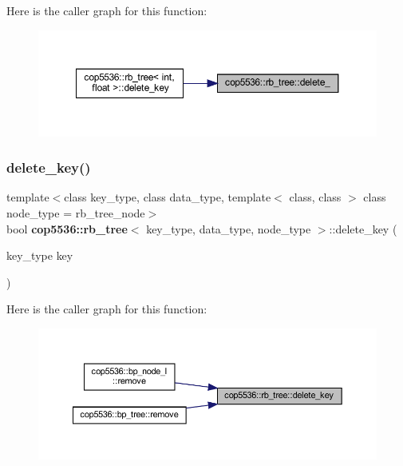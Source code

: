 Here is the caller graph for this function\+:
\nopagebreak
\begin{figure}[H]
\begin{center}
\leavevmode
\includegraphics[width=350pt]{classcop5536_1_1rb__tree_a82fcc1eec04d1c16b384aba305fd23f5_icgraph}
\end{center}
\end{figure}
\mbox{\label{classcop5536_1_1rb__tree_a25a915e3c06cbfb3d09c3ffd4fb26f82}} 
\subsubsection{delete\_key()}
{\footnotesize\ttfamily template$<$class key\+\_\+type, class data\+\_\+type, template$<$ class, class $>$ class node\+\_\+type = rb\+\_\+tree\+\_\+node$>$ \\
bool \textbf{ cop5536\+::rb\+\_\+tree}$<$ key\+\_\+type, data\+\_\+type, node\+\_\+type $>$\+::delete\+\_\+key (\begin{DoxyParamCaption}\item[{key\+\_\+type}]{key }\end{DoxyParamCaption})\hspace{0.3cm}{\ttfamily [inline]}}

Here is the caller graph for this function\+:
\nopagebreak
\begin{figure}[H]
\begin{center}
\leavevmode
\includegraphics[width=350pt]{classcop5536_1_1rb__tree_a25a915e3c06cbfb3d09c3ffd4fb26f82_icgraph}
\end{center}
\end{figure}
\mbox{\label{classcop5536_1_1rb__tree_a9e04d56dd575295b1e01e015aac1f76b}} 
